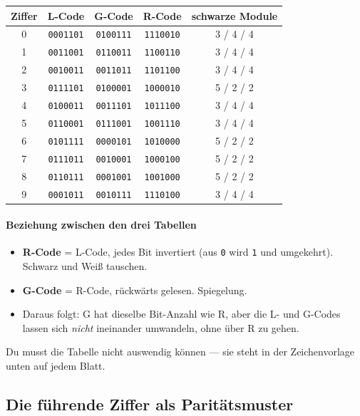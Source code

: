 \begin{center}
\begin{tabular}{c c c c c}
\toprule
\textbf{Ziffer} & \textbf{L-Code} & \textbf{G-Code} & \textbf{R-Code} & \textbf{schwarze Module}\\
\midrule
0 & \texttt{0001101} & \texttt{0100111} & \texttt{1110010} & 3 / 4 / 4 \\
1 & \texttt{0011001} & \texttt{0110011} & \texttt{1100110} & 3 / 4 / 4 \\
2 & \texttt{0010011} & \texttt{0011011} & \texttt{1101100} & 3 / 4 / 4 \\
3 & \texttt{0111101} & \texttt{0100001} & \texttt{1000010} & 5 / 2 / 2 \\
4 & \texttt{0100011} & \texttt{0011101} & \texttt{1011100} & 3 / 4 / 4 \\
5 & \texttt{0110001} & \texttt{0111001} & \texttt{1001110} & 3 / 4 / 4 \\
6 & \texttt{0101111} & \texttt{0000101} & \texttt{1010000} & 5 / 2 / 2 \\
7 & \texttt{0111011} & \texttt{0010001} & \texttt{1000100} & 5 / 2 / 2 \\
8 & \texttt{0110111} & \texttt{0001001} & \texttt{1001000} & 5 / 2 / 2 \\
9 & \texttt{0001011} & \texttt{0010111} & \texttt{1110100} & 3 / 4 / 4 \\
\bottomrule
\end{tabular}
\end{center}

\paragraph{Beziehung zwischen den drei Tabellen}
\begin{itemize}
\item \textbf{R-Code} = L-Code, jedes Bit invertiert (aus \texttt{0}
  wird \texttt{1} und umgekehrt). Schwarz und Weiß tauschen.
\item \textbf{G-Code} = R-Code, rückwärts gelesen. Spiegelung.
\item Daraus folgt: G hat dieselbe Bit-Anzahl wie R, aber die L- und
  G-Codes lassen sich \emph{nicht} ineinander umwandeln, ohne über R
  zu gehen.
\end{itemize}

Du musst die Tabelle nicht auswendig können — sie steht in der
Zeichenvorlage unten auf jedem Blatt.

\subsection*{Die führende Ziffer als Paritätsmuster}

